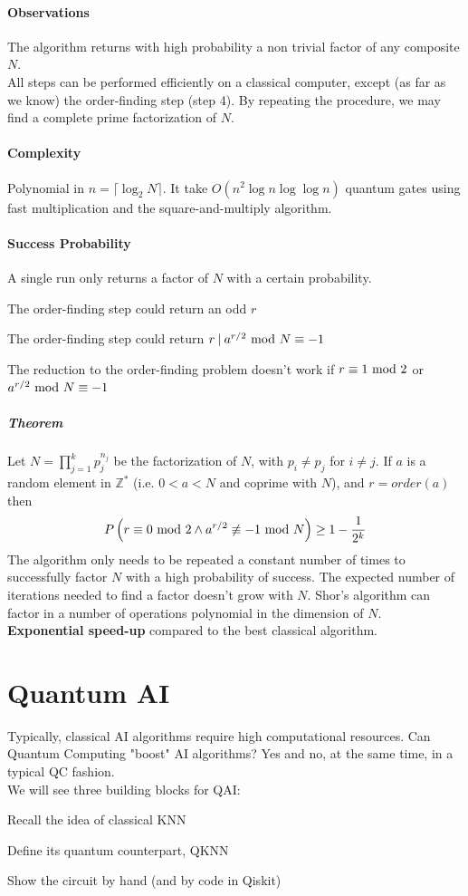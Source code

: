 \documentclass[10pt]{report}
\begin{document}
\paragraph{Observations} The algorithm returns with high probability a non trivial factor of any composite $N$.\\
All steps can be performed efficiently on a classical computer, except (as far as we know) the order-finding step (step 4). By repeating the procedure, we may find a complete prime factorization of $N$.
\paragraph{Complexity} Polynomial in $n=\lceil\log_2 N\rceil$. It take $O(n^2\log n\log\log n)$ quantum gates using fast multiplication and the square-and-multiply algorithm.
\paragraph{Success Probability} A single run only returns a factor of $N$ with a certain probability.\begin{list}{}{}
	\item The order-finding step could return an odd $r$
	\item The order-finding step could return $r\:|\:a^{r/2}\hbox{ mod }N \equiv -1$
	\item The reduction to the order-finding problem doesn't work if $r\equiv 1\hbox{ mod }2$ or $a^{r/2}\hbox{ mod }N \equiv -1$
\end{list}
\subparagraph{Theorem} Let $N = \prod_{j=1}^kp_j^{n_j}$ be the factorization of $N$, with $p_i\neq p_j$ for $i\neq j$. If $a$ is a random element in $\mathbb{Z}^*$ (i.e. $0<a<N$ and coprime with $N$), and $r = order(a)$ then
$$P\left(r\equiv 0\hbox{ mod }2\wedge a^{r/2}\not\equiv -1\hbox{ mod }N\right)\geq 1-\frac{1}{2^k}$$
The algorithm only needs to be repeated a constant number of times to successfully factor $N$ with a high probability of success. The expected number of iterations needed to find a factor doesn't grow with $N$. Shor's algorithm can factor in a number of operations polynomial in the dimension of $N$.\\
\textbf{Exponential speed-up} compared to the best classical algorithm.
\section{Quantum AI} Typically, classical AI algorithms require high computational resources. Can Quantum Computing "boost" AI algorithms? Yes and no, at the same time, in a typical QC fashion.\\
We will see three building blocks for QAI:
\begin{list}{}{}
	\item Recall the idea of classical KNN
	\item Define its quantum counterpart, QKNN
	\item Show the circuit by hand (and by code in Qiskit)
\end{list}
\end{document}
